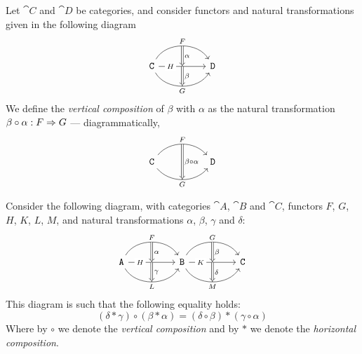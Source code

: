 \begin{definition}
\label{def:vertical-compostion-natural-transformation}
Let \(\cat C\) and \(\cat D\) be categories, and consider functors and natural
transformations given in the following diagram
\[
  \begin{tikzcd}
  \cat C \ar[rr, bend left=60, "F"{name=F}]
  \ar[rr, "H"{near start, description}, ""'{name=H}, ""{name=HH}]
  \ar[rr, bend right=60, swap, "G"{name=G}]
  & &\cat D
  \ar[Rightarrow, "\alpha", from=F, to=H]
  \ar[Rightarrow, "\beta", from=HH, to=G]
  \end{tikzcd}
\]
We define the \emph{vertical composition} of \(\beta\) with \(\alpha\) as the
natural transformation \(\beta \circ \alpha: F \Rightarrow G\) --- diagrammatically,
\[
  \begin{tikzcd}
  \cat C \ar[rr, bend left=50, "F"{name=F}]
  \ar[rr, bend right=50, swap, "G"{name=G}]
  &&\cat D
  \ar[Rightarrow, "\beta \circ \alpha", from=F, to=G]
  \end{tikzcd}
\]
\end{definition}

\begin{proposition}
\label{prop:mixing-vertical-and-horizontal-compositions}
Consider the following diagram, with categories \(\cat A\), \(\cat B\) and
\(\cat C\), functors \(F\), \(G\), \(H\), \(K\), \(L\), \(M\), and natural
transformations \(\alpha\), \(\beta\), \(\gamma\) and \(\delta\):
\[
\begin{tikzcd}
\cat A
\ar[rr, bend left=60, "F"{name=F}]
\ar[rr, "H"{description, near start}, ""'{name=H}, ""{name=HH}]
\ar[rr, bend right=60, "L"'{name=L}]
&& \cat B
\ar[rr, bend left=60, "G"{name=G}]
\ar[rr, "K"{description, near start}, ""'{name=K}, ""{name=KK}]
\ar[rr, bend right=60, "M"'{name=M}]
&&\cat C
\ar[Rightarrow, "\alpha", from=F, to=H]
\ar[Rightarrow, from=HH, to=L, "\gamma"]
\ar[Rightarrow, "\beta", from=G, to=K]
\ar[Rightarrow, from=KK, to=M, "\delta"]
\end{tikzcd}
\]
This diagram is such that the following equality holds:
\[
(\delta * \gamma) \circ (\beta * \alpha)
= (\delta \circ \beta) * (\gamma \circ \alpha)
\]
Where by \(\circ\) we denote the \emph{vertical composition} and by \(*\) we
denote the \emph{horizontal composition}.
\end{proposition}

